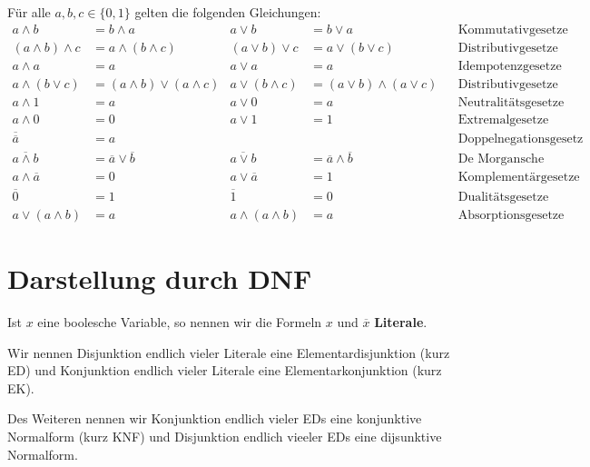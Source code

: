 \begin{prop}
	Für alle $a,b,c \in \{0,1\}$ gelten die folgenden Gleichungen: 
	\footnotesize
		\begin{align*}
			a \wedge b & = b \wedge a &  a \vee b & = b \vee a & & \text{Kommutativgesetze} 
			\\ (a \wedge b) \wedge c & = a \wedge (b \wedge c) &  (a \vee b) \vee c& = a \vee (b \vee c) & & \text{Distributivgesetze} 
			\\ a \wedge a & = a  & a \vee a & = a  & & \text{Idempotenzgesetze} 
			\\ a \wedge (b \vee c) & = (a \wedge b) \vee (a \wedge c) &  a \vee (b \wedge c) & = (a \vee b) \wedge (a \vee c)  && \text{Distributivgesetze} 
			\\ a \wedge 1 & = a  & a \vee 0 & = a  & & \text{Neutralitätsgesetze} 
			\\ a \wedge 0 & = 0 &  a \vee 1 & = 1 & & \text{Extremalgesetze} 
			\\ \overline{\overline{a}} & = a & & & & \text{Doppelnegationsgesetz}			
			\\ \overline{a \wedge b} & = \overline{a} \vee \overline{b}  & \overline{a \vee b} & = \overline{a} \wedge \overline{b} & & \text{De Morgansche Gesetze} 
			\\ a \wedge \overline{a} & = 0  & a \vee \overline{a} & = 1 & & \text{Komplementärgesetze}
			\\ \overline{0} & = 1 & \overline{1} & = 0 & & \text{Dualitätsgesetze} 
			\\ a \vee (a \wedge b) & = a & a \wedge (a \wedge b) & = a & & \text{Absorptionsgesetze}
		\end{align*} 
\end{prop} 





\section{Darstellung durch DNF} 

\begin{defn}
	Ist $x$ eine boolesche Variable, so nennen wir die Formeln $x$ und $\overline{x}$ \textbf{Literale}. 
	
	Wir nennen Disjunktion endlich vieler Literale eine Elementardisjunktion (kurz ED) und Konjunktion endlich vieler Literale eine Elementarkonjunktion (kurz EK). 
	
	Des Weiteren nennen wir Konjunktion endlich vieler EDs eine konjunktive Normalform (kurz KNF) und Disjunktion endlich vieeler EDs eine dijsunktive Normalform. 
\end{defn} 


